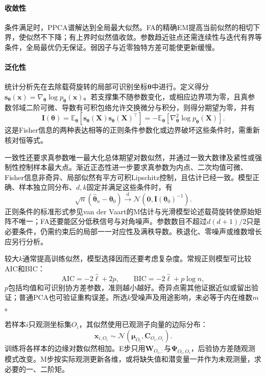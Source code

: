 \paragraph{收敛性}

条件满足时，PPCA谱解达到全局最大似然。FA的精确EM提高当前似然的相切下界，使似然不下降；有上界时似然值收敛。参数趋近驻点还需连续性与迭代有界等条件，全局最优仍无保证。弱因子与近零独特方差可能使更新缓慢。

\paragraph{泛化性}

统计分析先在去除载荷旋转的局部可识别坐标$\bm{\theta}$中进行。定义得分$\bm{s}_{\bm{\theta}}(\bm{x})=\nabla_{\bm{\theta}}\log p_{\bm{\theta}}(\bm{x})$。若支撑集不随参数变化，或相应边界项为零，且真参数邻域二阶可微、导数有可积包络允许交换微分与积分，则得分期望为零，并有
\[
  \bm{I}(\bm{\theta})
  =\mathbb{E}_{\bm{\theta}}\!\left[
      \bm{s}_{\bm{\theta}}(\bm{X})
      \bm{s}_{\bm{\theta}}(\bm{X})^{\top}
    \right]
  =-\mathbb{E}_{\bm{\theta}}\!\left[
      \nabla_{\bm{\theta}}^2\log p_{\bm{\theta}}(\bm{X})
    \right].
\]
这是Fisher信息的两种表达相等的正则条件参数化或边界破坏这些条件时，需重新核对恒等式。

一致性还要求真参数唯一最大化总体期望对数似然，并通过一致大数律及紧性或强制性控制样本最大点。渐近正态性进一步要求真参数为内点、二次均值可微、Fisher信息非奇异、局部似然有平方可积Lipschitz控制，且估计已经一致。模型正确、样本独立同分布、$d,k$固定并满足这些条件时，有
\[
  \sqrt{n}(\widehat{\bm{\theta}}_n-\bm{\theta}_0)
  \xrightarrow{\mathrm d}
  \mathcal{N}\!\left(
    \bm{0},\bm{I}(\bm{\theta}_0)^{-1}
  \right).
\]
正则条件的标准形式参见van der Vaart的M估计与光滑模型论述载荷旋转使原始矩阵不唯一；FA还要能区分低秩信号与对角噪声。参数数目不超过$d(d+1)/2$只是必要条件，仍需约束后的局部一一对应性及满秩导数。秩退化、零噪声或维数增长应另行分析。

较大$k$通常提高训练似然，模型选择因而还要考虑复杂度。常规正则模型可比较AIC和BIC：
\[
\mathrm{AIC}=-2\hat{\ell}+2p,\qquad
\mathrm{BIC}=-2\hat{\ell}+p\log n,
\]
$p$包括均值和可识别协方差参数，准则越小越好。奇异点需其他证据近似或留出验证；普通PCA也可验证重构误差。所选$k$受噪声及用途影响，未必等于内在维数$m$。

若样本$i$只观测坐标集$O_i$，其似然使用已观测子向量的边际分布：
\begin{equation}
\label{eq:dim-linear-missing}
\bm{x}_{i,O_i}\sim
\mathcal{N}(\bm{\mu}_{O_i},\bm{C}_{O_i,O_i}).
\end{equation}
训练将各样本的边缘对数似然相加。E步只用$\bm{W}_{O_i,:}$与$\bm{\Psi}_{O_i,O_i}$，后验协方差随观测模式改变。M步按实际观测更新各维，或将缺失值和潜变量一并作为未观测量，求必要的一、二阶矩。

